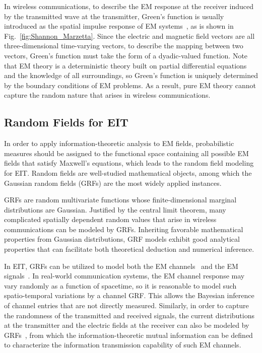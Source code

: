 \documentclass[journal,twocolumn]{IEEEtran}
\begin{document}
In wireless communications, to describe the EM response at the receiver induced by the transmitted wave at the transmitter, Green's function is usually introduced as the spatial impulse response of EM systems~\cite{stratton2007electromagnetic}, as is shown in Fig.~\ref{fig:Shannon_Marzetta}. Since the electric and magnetic field vectors are all three-dimensional time-varying vectors, to describe the mapping between two vectors, Green's function must take the form of a dyadic-valued function. 
Note that EM theory is a deterministic theory built on partial differential equations and the knowledge of all surroundings, so Green's function is uniquely determined by the boundary conditions of EM problems.
As a result, pure EM theory cannot capture the random nature that arises in wireless communications. 

\subsection{Random Fields for EIT}
\label{Sec_2_Subsec_4}
In order to apply information-theoretic analysis to EM fields, probabilistic measures should be assigned to the functional space containing all possible EM fields that satisfy Maxwell's equations, which leads to the random field modeling for EIT. 
Random fields are well-studied mathematical objects, among which the Gaussian random fields (GRFs) are the most widely applied instances. 

GRFs are random multivariate functions whose finite-dimensional marginal distributions are Gaussian. Justified by the central limit theorem, many complicated spatially dependent random values that arise in wireless communications can be modeled by GRFs.  
Inheriting favorable mathematical properties from Gaussian distributions, GRF models exhibit good analytical properties that can facilitate both theoretical deduction and numerical inference. 

In EIT, GRFs can be utilized to model both the EM channels~\cite{marzetta2022fourier} and the EM signals~\cite{wan2022mutual}. 
In real-world communication systems, the EM channel response may vary randomly as a function of spacetime, so it is reasonable to model such spatio-temporal variations by a channel GRF. 
This allows the Bayesian inference of channel entries that are not directly measured. 
Similarly, in order to capture the randomness of the transmitted and received signals, the current distributions at the transmitter and the electric fields at the receiver can also be modeled by GRFs~\cite{wan2022mutual}, from which the information-theoretic mutual information can be defined to characterize the information transmission capability of such EM channels. 
\end{document}
